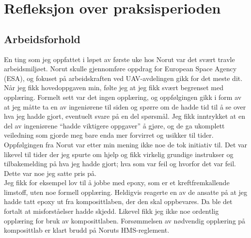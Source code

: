 \documentclass[12pt, a4paper]{article}
\begin{document}
\newpage
\section{Refleksjon over praksisperioden}
\subsection{Arbeidsforhold}
En ting som jeg oppfattet i løpet av første uke hos Norut var det svært travle arbeidsmiljøet. Norut skulle gjennomføre oppdrag for European Space Agency (ESA), og fokuset på arbeidskraften ved UAV-avdelingen gikk for det meste dit.\\
Når jeg fikk hovedoppgaven min, følte jeg at jeg fikk svært begrenset med opplæring. Formelt sett var det ingen opplæring, og oppfølgingen gikk i form av at jeg måtte ta en av ingeniørene til siden og spørre om de hadde tid til å se over hva jeg hadde gjort, eventuelt svare på en del spørsmål. Jeg fikk inntrykket at en del av ingeniørene ``hadde viktigere oppgaver'' å gjøre, og de ga ukomplett veiledning som gjorde meg bare enda mer forvirret og usikker til tider. Oppfølgingen fra Norut var etter min mening ikke noe de tok initiativ til. Det var likevel til tider der jeg spurte om hjelp og fikk virkelig grundige instrukser og tilbakemelding på hva jeg hadde gjort; hva som var feil og hvorfor det var feil. Dette var noe jeg satte pris på.\\

Jeg fikk for eksempel lov til å jobbe med epoxy, som er et kreftfremkallende limstoff, uten noe formell opplæring. Heldigvis reagerte en av de ansatte på at jeg hadde tatt epoxy ut fra komposittlaben, der den skal oppbevares. Da ble det fortalt at misforståelser hadde skjedd. Likevel fikk jeg ikke noe ordentlig opplæring for bruk av komposittlaben. Forsømmelsen av nødvendig opplæring på komposittlab er klart brudd på Noruts HMS-reglement. \\
\end{document}
